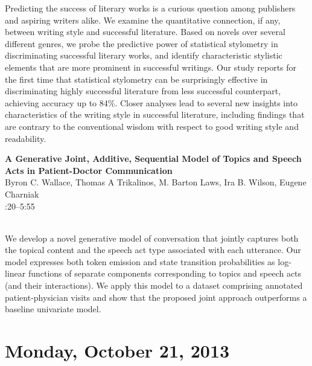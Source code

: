 \documentclass[twoside,makeidx]{book}
\renewcommand{\normalsize}{\fontsize{8}{9}\selectfont}
\renewcommand{\small}{\fontsize{7}{8}\selectfont}
\begin{document}
\nopagebreak%
\noindent%
{\small Predicting the success of literary works is a curious question among publishers and aspiring writers alike. We examine the quantitative connection, if any, between writing style and successful literature. Based on novels over several different genres, we probe the predictive power of statistical stylometry in discriminating successful literary works, and identify characteristic stylistic elements that are more prominent in successful writings. Our study reports for the first time that statistical stylometry can be surprisingly effective in discriminating highly successful literature from less successful counterpart, achieving accuracy up to 84\%. Closer analyses lead to several new insights into characteristics of the writing style in successful literature, including findings that are contrary to the conventional wisdom with respect to good writing style and readability.}
\par\vspace{2em}\noindent%
\begin{minipage}{\linewidth}%
\begin{center}
\textbf{\normalsize A Generative Joint, Additive, Sequential Model of Topics and Speech Acts in Patient-Doctor Communication}\\
\normalsize  Byron C. Wallace,  Thomas A Trikalinos,  M. Barton Laws,  Ira B. Wilson,  Eugene Charniak\\
{\small 5:20--5:55}\\
\end{center}
\end{minipage}\\[0.5em]
\nopagebreak%
\noindent%
{\small We develop a novel generative model of conversation that jointly captures both the topical content and the speech act type associated with each utterance. Our model expresses both token emission and state transition probabilities as log-linear functions of separate components corresponding to topics and speech acts (and their interactions). We apply this model to a dataset comprising annotated patient-physician visits and show that the proposed joint approach outperforms a baseline univariate model.}
\clearpage
\chapter{Monday, October 21, 2013}
\end{document}
